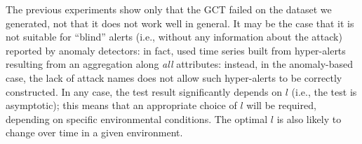 The previous experiments show only that the \ac{GCT} failed on the dataset we generated, not that it does not work well in general. It may be the case that it is not suitable for ``blind'' alerts (i.e., without any information about the attack) reported by anomaly detectors: in fact, \citep{dblp:conf/raid/qinl03} used time series built from hyper-alerts resulting from an aggregation along \emph{all} attributes: instead, in the anomaly-based case, the lack of attack names does not allow such hyper-alerts to be correctly constructed. In any case, the test result significantly depends on $l$ (i.e., the test is asymptotic); this means that an appropriate choice of $l$ will be required, depending on specific environmental conditions. The optimal $l$ is also likely to change over time in a given environment.

\begin{figure}[p]
  \centering
  
  
  

\end{figure}
